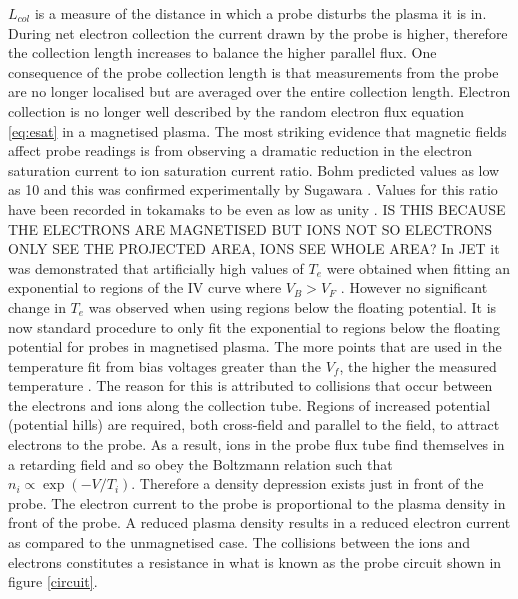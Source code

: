 $L_{col}$ is a measure of the distance in which a probe disturbs the plasma it is in. During net electron collection the current drawn by the probe is higher, therefore the collection length increases to balance the higher parallel flux. %
One consequence of the probe collection length is that measurements from the probe are no longer localised but are averaged over the entire collection length. Electron collection is no longer well described by the random electron flux equation \eqref{eq:esat} in a magnetised plasma. The most striking evidence that magnetic fields affect probe readings is from observing a dramatic reduction in the electron saturation current to ion saturation current ratio. Bohm predicted values as low as 10 \cite{discharges} and this was confirmed experimentally by Sugawara \cite{monk}. Values for this ratio have been recorded in tokamaks to be even as low as unity \cite{matthews}. IS THIS BECAUSE THE ELECTRONS ARE MAGNETISED BUT IONS NOT SO ELECTRONS ONLY SEE THE PROJECTED AREA, IONS SEE WHOLE AREA? In JET it was demonstrated that artificially high values of $T_e$ were obtained when fitting an exponential to regions of the IV curve where $V_B > V_F$ \cite{JET_TE}. However no significant change in $T_e$ was observed when using regions below the floating potential. It is now standard procedure to only fit the exponential to regions below the floating potential for probes in magnetised plasma. The more points that are used in the temperature fit from bias voltages greater than the $V_f$, the higher the measured temperature \cite{matthews}. The reason for this is attributed to collisions that occur between the electrons and ions along the collection tube. Regions of increased potential (potential hills) are required, both cross-field and parallel to the field, to attract electrons to the probe. As a result, ions in the probe flux tube find themselves in a retarding field and so obey the Boltzmann relation such that $n_i \propto \exp(-V/T_i)$. Therefore a density depression exists just in front of the probe. The electron current to the probe is proportional to the plasma density in front of the probe. A reduced plasma density results in a reduced electron current as compared to the unmagnetised case. The collisions between the ions and electrons constitutes a resistance in what is known as the probe circuit shown in figure \ref{circuit}.


